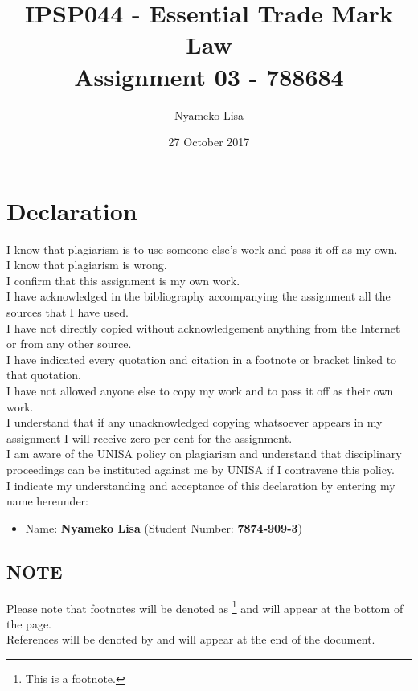 \documentclass[11pt]{article}
\author{Nyameko Lisa}
\date{27 October 2017}
\title{IPSP044 - Essential Trade Mark Law\\\medskip
\large Assignment 03 - 788684}
\begin{document}
\maketitle
\addvspace{110pt}

\justifying
\addvspace{110pt}
\section*{Declaration}
\label{sec:org8ee10ff}
I know that plagiarism is to use someone else’s work and pass it off as my own.\\
I know that plagiarism is wrong.\\
I confirm that this assignment is my own work.\\
I have acknowledged in the bibliography accompanying the assignment all the sources that I have used.\\
I have not directly copied without acknowledgement anything from the Internet or from any other source.\\
I have indicated every quotation and citation in a footnote or bracket linked to that quotation.\\
I have not allowed anyone else to copy my work and to pass it off as their own work.\\
I understand that if any unacknowledged copying whatsoever appears in my assignment I will receive zero per cent for the assignment.\\
I am aware of the UNISA policy on plagiarism and understand that disciplinary proceedings can be instituted against me by UNISA if I contravene this policy.\\
I indicate my understanding and acceptance of this declaration by
entering my name hereunder:
\begin{itemize}
\item Name: \textbf{Nyameko Lisa} (Student Number: \textbf{7874-909-3})
\end{itemize}

\subsection*{NOTE}
\label{sec:org02f6ee7}
Please note that footnotes will be denoted as \footnote{This is a footnote.} and will
appear at the bottom of the page.\\
References will be denoted by \cite{rsa78_patents_act} and will appear at the end of the document.
\newpage
\end{document}
